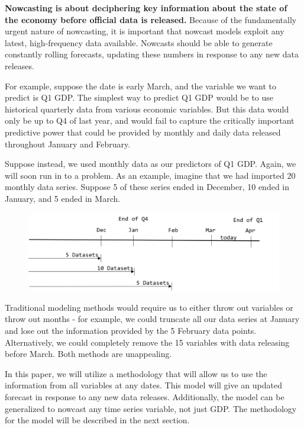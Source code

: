 \documentclass[11pt, letterpaper]{article}\usepackage[]{graphicx}\usepackage[]{color}
\begin{document}
\textbf{Nowcasting is about deciphering key information about the state of the economy before official data is released.} Because of the fundamentally urgent nature of nowcasting, it is important that nowcast models exploit any latest, high-frequency data available. Nowcasts should be able to generate constantly rolling forecasts, updating these numbers in response to any new data releases.




For example, suppose the date is early March, and the variable we want to predict is Q1 GDP. The simplest way to predict Q1 GDP would be to use historical quarterly data from various economic variables. But this data would only be up to Q4 of last year, and would fail to capture the critically important predictive power that could be provided by monthly and daily data released throughout January and February.

Suppose instead, we used monthly data as our predictors of Q1 GDP. Again, we will soon run in to a problem. As an example, imagine that we had imported 20 monthly data series. Suppose 5 of these series ended in December, 10 ended in January, and 5 ended in March. 

\begin{figure}[H]
\includegraphics[scale=.7]{nowcast-time-2}
\centering
\end{figure}

Traditional modeling methods would require us to either throw out variables or throw out months - for example, we could truncate all our data series at January and lose out the information provided by the 5 February data points. Alternatively, we could completely remove the 15 variables with data releasing before March. Both methods are unappealing.

In this paper, we will utilize a methodology that will allow us to use the information from all variables at any dates. This model will give an updated forecast in response to any new data releases. Additionally, the model can be generalized to nowcast any time series variable, not just GDP. The methodology for the model will be described in the next section.
\end{document}
